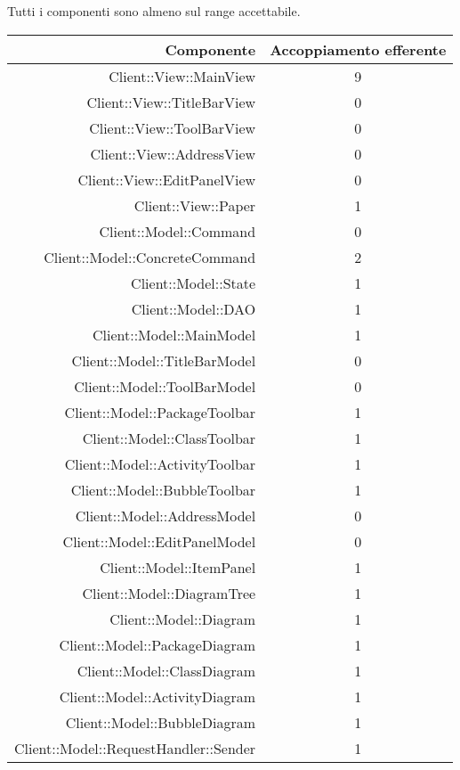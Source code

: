 \documentclass[../PianoDiQualifica.tex]{subfiles}
\begin{document}
					Tutti i componenti sono almeno sul range accettabile.
					\begin{longtable}{|r|c|}
						\hline
						\rowcolor{blue!30}\textbf{Componente} & \textbf{Accoppiamento efferente} \\
						\hline
						\endhead
						Client::View::MainView & 9 \\ \hline
						Client::View::TitleBarView & 0 \\ \hline
						Client::View::ToolBarView & 0 \\ \hline
						Client::View::AddressView & 0 \\ \hline
						Client::View::EditPanelView & 0 \\ \hline
						Client::View::Paper & 1 \\ \hline
						Client::Model::Command & 0\\ \hline
						Client::Model::ConcreteCommand & 2 \\ \hline
						Client::Model::State & 1 \\ \hline
						Client::Model::DAO & 1 \\ \hline
						Client::Model::MainModel & 1 \\ \hline
						Client::Model::TitleBarModel & 0 \\ \hline
						Client::Model::ToolBarModel & 0 \\ \hline
						Client::Model::PackageToolbar & 1 \\ \hline
						Client::Model::ClassToolbar & 1 \\ \hline
						Client::Model::ActivityToolbar & 1 \\ \hline
						Client::Model::BubbleToolbar & 1 \\ \hline
						Client::Model::AddressModel & 0 \\ \hline
						Client::Model::EditPanelModel & 0 \\ \hline
						Client::Model::ItemPanel & 1 \\ \hline
						Client::Model::DiagramTree & 1 \\ \hline
						Client::Model::Diagram & 1 \\ \hline
						Client::Model::PackageDiagram & 1 \\ \hline
						Client::Model::ClassDiagram & 1 \\ \hline
						Client::Model::ActivityDiagram & 1 \\ \hline
						Client::Model::BubbleDiagram & 1 \\ \hline
						Client::Model::RequestHandler::Sender & 1 \\ \hline

\end{longtable}
\end{document}
